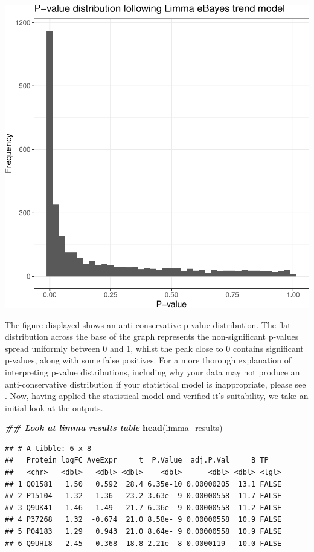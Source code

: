 \documentclass[9pt,a4paper,]{extarticle}
\newenvironment{Shaded}{\begin{snugshade}}{\end{snugshade}}
\newcommand{\DocumentationTok}[1]{\textcolor[rgb]{0.56,0.35,0.01}{\textbf{\textit{#1}}}}
\newcommand{\FunctionTok}[1]{\textcolor[rgb]{0.13,0.29,0.53}{\textbf{#1}}}
\newcommand{\NormalTok}[1]{#1}
\begin{document}
\begin{center}\includegraphics[height=0.3\textheight]{workflow_expressions_files/figure-latex/pvalue_histogram-1} \end{center}

The figure displayed shows an anti-conservative p-value distribution. The flat
distribution across the base of the graph represents the non-significant p-values
spread uniformly between 0 and 1, whilst the peak close to 0 contains significant
p-values, along with some false positives. For a more thorough explanation of
interpreting p-value distributions, including why your data may not produce an
anti-conservative distribution if your statistical model is inappropriate, please
see \citep{p_val}. Now, having applied the statistical model and verified it's
suitability, we take an initial look at the outputs.

\begin{Shaded}
\begin{Highlighting}[]
\DocumentationTok{\#\# Look at limma results table}
\FunctionTok{head}\NormalTok{(limma\_results)}
\end{Highlighting}
\end{Shaded}

\begin{verbatim}
## # A tibble: 6 x 8
##   Protein logFC AveExpr     t  P.Value  adj.P.Val     B TP   
##   <chr>   <dbl>   <dbl> <dbl>    <dbl>      <dbl> <dbl> <lgl>
## 1 Q01581   1.50   0.592  28.4 6.35e-10 0.00000205  13.1 FALSE
## 2 P15104   1.32   1.36   23.2 3.63e- 9 0.00000558  11.7 FALSE
## 3 Q9UK41   1.46  -1.49   21.7 6.36e- 9 0.00000558  11.2 FALSE
## 4 P37268   1.32  -0.674  21.0 8.58e- 9 0.00000558  10.9 FALSE
## 5 P04183   1.29   0.943  21.0 8.64e- 9 0.00000558  10.9 FALSE
## 6 Q9UHI8   2.45   0.368  18.8 2.21e- 8 0.0000119   10.0 FALSE
\end{verbatim}
\end{document}
